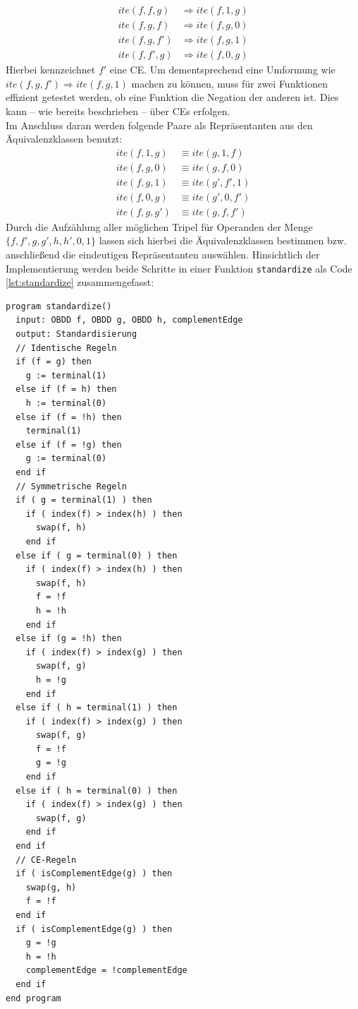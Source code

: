 \begin{equation*}
\begin{split}
ite(f,f,g) &\Rightarrow ite(f,1,g)\\
ite(f,g,f) &\Rightarrow ite(f,g,0)\\
ite(f,g,f') &\Rightarrow ite(f,g,1)\\
ite(f,f',g) &\Rightarrow ite(f,0,g)
\end{split}
\end{equation*}
Hierbei kennzeichnet $f'$ eine CE. Um dementsprechend eine Umformung wie \\$ite(f,g,f') \Rightarrow ite(f,g,1)$ machen zu können, muss für zwei Funktionen effizient getestet werden, ob eine Funktion die Negation der anderen ist. Dies kann -- wie bereits beschrieben -- über CEs erfolgen.\\
Im Anschluss daran werden folgende Paare als Repräsentanten aus den Äquivalenzklassen benutzt:
\begin{equation*}
\begin{split}
ite(f,1,g) &\equiv ite(g,1,f)\\
ite(f,g,0) &\equiv ite(g,f,0)\\
ite(f,g,1) &\equiv ite(g',f',1)\\
ite(f,0,g) &\equiv ite(g',0,f')\\
ite(f,g,g') &\equiv ite(g,f,f')
\end{split}
\end{equation*}
Durch die Aufzählung aller möglichen Tripel für Operanden der Menge\\ $\{ f,f',g,g',h,h',0,1 \}$ lassen sich hierbei die Äquivalenzklassen bestimmen bzw. anschließend die eindeutigen Repräsentanten auswählen. Hinsichtlich der Implementierung werden beide Schritte in einer Funktion \texttt{standardize} als Code \ref{lst:standardize} zusammengefasst:
\lstset{language=xml}
\begin{lstlisting}[frame=htrbl, caption={Implementierung von {\ttfamily standardize}}, label={lst:standardize}]
program standardize()
  input: OBDD f, OBDD g, OBDD h, complementEdge
  output: Standardisierung
  // Identische Regeln
  if (f = g) then
    g := terminal(1)
  else if (f = h) then
    h := terminal(0)
  else if (f = !h) then
    terminal(1)
  else if (f = !g) then
    g := terminal(0)
  end if
  // Symmetrische Regeln
  if ( g = terminal(1) ) then
    if ( index(f) > index(h) ) then
      swap(f, h)
    end if
  else if ( g = terminal(0) ) then
    if ( index(f) > index(h) ) then
      swap(f, h)
      f = !f
      h = !h
    end if
  else if (g = !h) then 
    if ( index(f) > index(g) ) then
      swap(f, g)
      h = !g
    end if
  else if ( h = terminal(1) ) then
    if ( index(f) > index(g) ) then
      swap(f, g)
      f = !f
      g = !g
    end if
  else if ( h = terminal(0) ) then
    if ( index(f) > index(g) ) then
      swap(f, g)
    end if
  end if
  // CE-Regeln
  if ( isComplementEdge(g) ) then
    swap(g, h)
    f = !f
  end if
  if ( isComplementEdge(g) ) then
    g = !g
    h = !h
    complementEdge = !complementEdge
  end if
end program
\end{lstlisting}
